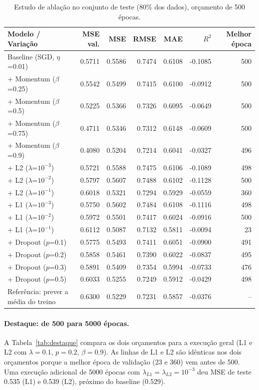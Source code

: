 \documentclass[11pt,a4paper]{article}
\begin{document}
\begin{table}[H]
\centering\small
\caption{Estudo de ablação no conjunto de teste (80\% dos dados), orçamento de 500 épocas.}
\label{tab:abl}
\begin{tabular}{lrrrrrr}
\toprule
Modelo / Variação & MSE val. & MSE & RMSE & MAE & $R^2$ & Melhor época \\
\midrule
Baseline (SGD, $\eta$=0.01) & 0.5711 & 0.5586 & 0.7474 & 0.6108 & -0.1085 & 500 \\
\midrule
+ Momentum ($\beta$=0.25) & 0.5542 & 0.5499 & 0.7415 & 0.6100 & -0.0912 & 500 \\
+ Momentum ($\beta$=0.5) & 0.5225 & 0.5366 & 0.7326 & 0.6095 & -0.0649 & 500 \\
+ Momentum ($\beta$=0.75) & 0.4711 & 0.5346 & 0.7312 & 0.6148 & -0.0609 & 500 \\
+ Momentum ($\beta$=0.9) & 0.4080 & 0.5204 & 0.7214 & 0.6041 & -0.0327 & 496 \\
\midrule
+ L2 ($\lambda$=$10^{-3}$) & 0.5721 & 0.5588 & 0.7475 & 0.6106 & -0.1089 & 498 \\
+ L2 ($\lambda$=$10^{-2}$) & 0.5797 & 0.5607 & 0.7488 & 0.6102 & -0.1128 & 500 \\
+ L2 ($\lambda$=$10^{-1}$) & 0.6018 & 0.5321 & 0.7294 & 0.5929 & -0.0559 & 360 \\
\midrule
+ L1 ($\lambda$=$10^{-3}$) & 0.5750 & 0.5602 & 0.7484 & 0.6108 & -0.1116 & 498 \\
+ L1 ($\lambda$=$10^{-2}$) & 0.5972 & 0.5501 & 0.7417 & 0.6024 & -0.0916 & 500 \\
+ L1 ($\lambda$=$10^{-1}$) & 0.6112 & 0.5087 & 0.7132 & 0.5811 & -0.0094 & 23 \\
\midrule
+ Dropout ($p$=0.1) & 0.5775 & 0.5493 & 0.7411 & 0.6051 & -0.0900 & 491 \\
+ Dropout ($p$=0.2) & 0.5858 & 0.5461 & 0.7390 & 0.6022 & -0.0837 & 495 \\
+ Dropout ($p$=0.3) & 0.5891 & 0.5409 & 0.7354 & 0.5994 & -0.0733 & 476 \\
+ Dropout ($p$=0.5) & 0.6033 & 0.5255 & 0.7249 & 0.5912 & -0.0429 & 498 \\
\midrule
Referência: prever a média do treino & 0.6300 & 0.5229 & 0.7231 & 0.5857 & -0.0376 & -- \\
\bottomrule
\end{tabular}
\end{table}

\paragraph{Destaque: de 500 para 5000 épocas.} A Tabela~\ref{tab:destaque} compara os dois orçamentos para a execução geral (L1 e L2 com $\lambda=0.1$, $p=0.2$, $\beta=0.9$). As linhas de L1 e L2 são idênticas nos dois orçamentos porque a melhor época de validação (23 e 360) vem antes de 500. Uma execução adicional de 5000 épocas com $\lambda_{L1}=\lambda_{L2}=10^{-3}$ deu MSE de teste 0.535 (L1) e 0.539 (L2), próximo do baseline (0.529).
\end{document}
